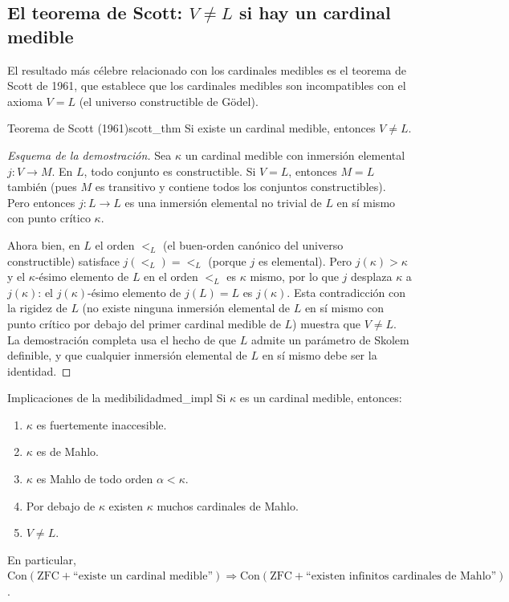 \subsection{El teorema de Scott: $V \neq L$ si hay un cardinal medible}

El resultado más célebre relacionado con los cardinales medibles es el teorema de Scott de 1961, que establece que los cardinales medibles son incompatibles con el axioma $V = L$ (el universo constructible de Gödel).

\begin{teorema}{Teorema de Scott (1961)}{scott_thm}
Si existe un cardinal medible, entonces $V \neq L$.
\end{teorema}

\begin{proof}[Esquema de la demostración]
Sea $\kappa$ un cardinal medible con inmersión elemental $j: V \to M$. En $L$, todo conjunto es constructible. Si $V = L$, entonces $M = L$ también (pues $M$ es transitivo y contiene todos los conjuntos constructibles). Pero entonces $j: L \to L$ es una inmersión elemental no trivial de $L$ en sí mismo con punto crítico $\kappa$.

Ahora bien, en $L$ el orden $<_L$ (el buen-orden canónico del universo constructible) satisface $j(<_L) = <_L$ (porque $j$ es elemental). Pero $j(\kappa) > \kappa$ y el $\kappa$-ésimo elemento de $L$ en el orden $<_L$ es $\kappa$ mismo, por lo que $j$ desplaza $\kappa$ a $j(\kappa)$: el $j(\kappa)$-ésimo elemento de $j(L) = L$ es $j(\kappa)$. Esta contradicción con la rigidez de $L$ (no existe ninguna inmersión elemental de $L$ en sí mismo con punto crítico por debajo del primer cardinal medible de $L$) muestra que $V \neq L$. La demostración completa usa el hecho de que $L$ admite un parámetro de Skolem definible, y que cualquier inmersión elemental de $L$ en sí mismo debe ser la identidad.
\end{proof}

\begin{corolario}{Implicaciones de la medibilidad}{med_impl}
Si $\kappa$ es un cardinal medible, entonces:
\begin{enumerate}[leftmargin=2em, label=(\roman*)]
  \item $\kappa$ es fuertemente inaccesible.
  \item $\kappa$ es de Mahlo.
  \item $\kappa$ es Mahlo de todo orden $\alpha < \kappa$.
  \item Por debajo de $\kappa$ existen $\kappa$ muchos cardinales de Mahlo.
  \item $V \neq L$.
\end{enumerate}
En particular, $\mathrm{Con}(\mathrm{ZFC} + \text{``existe un cardinal medible''}) \Rightarrow \mathrm{Con}(\mathrm{ZFC} + \text{``existen infinitos cardinales de Mahlo''})$.
\end{corolario}

